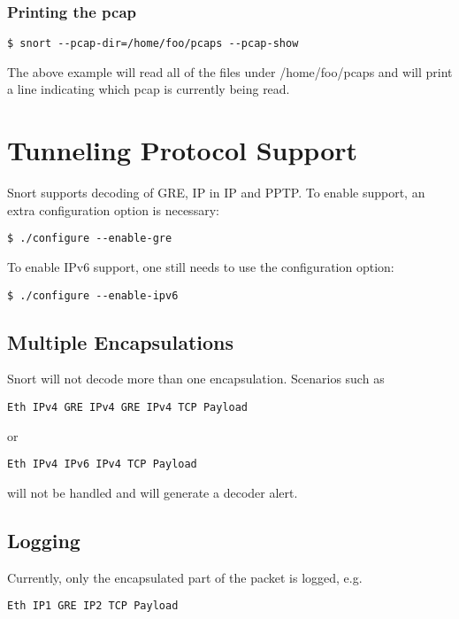 \documentclass[english]{report}
\begin{document}
\subsubsection{Printing the pcap}

\begin{verbatim}
$ snort --pcap-dir=/home/foo/pcaps --pcap-show
\end{verbatim}

The above example will read all of the files under /home/foo/pcaps and
will print a line indicating which pcap is currently being read.


\section{Tunneling Protocol Support}

Snort supports decoding of GRE, IP in IP and PPTP.  To enable support, an extra configuration
option is necessary:

\begin{verbatim}
$ ./configure --enable-gre
\end{verbatim}

To enable IPv6 support, one still needs to use the configuration option:

\begin{verbatim}
$ ./configure --enable-ipv6
\end{verbatim}

\subsection{Multiple Encapsulations}
Snort will not decode more than one encapsulation.  Scenarios such as

\begin{verbatim}
Eth IPv4 GRE IPv4 GRE IPv4 TCP Payload
\end{verbatim}

or

\begin{verbatim}
Eth IPv4 IPv6 IPv4 TCP Payload
\end{verbatim}

will not be handled and will generate a decoder alert.

\subsection{Logging}
Currently, only the encapsulated part of the packet is logged, e.g.

\begin{verbatim}
Eth IP1 GRE IP2 TCP Payload
\end{verbatim}
\end{document}
